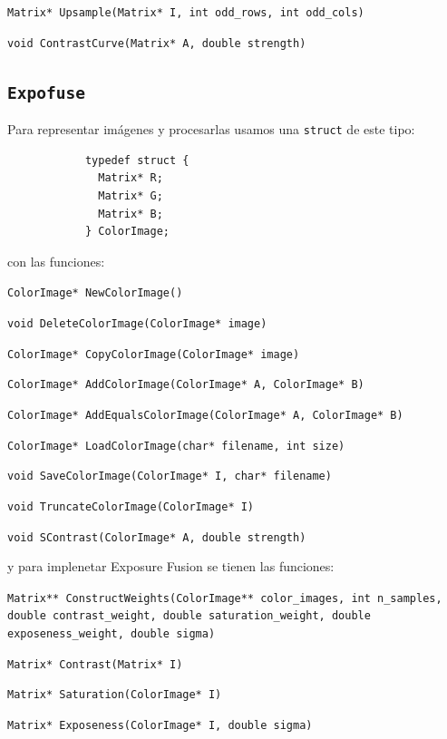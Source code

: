 \documentclass[a4paper,10pt]{article}
\begin{document}
            \texttt{Matrix* Upsample(Matrix* I, int odd\_rows, int odd\_cols)}
            
            \texttt{void ContrastCurve(Matrix* A, double strength)}
        
        \subsection{\texttt{Expofuse}}
            Para representar imágenes y procesarlas usamos una \texttt{struct} de este tipo:
            
            \begin{verbatim}
            typedef struct {
              Matrix* R;
              Matrix* G;
              Matrix* B;
            } ColorImage;\end{verbatim}
            
            con las funciones:
            
            \texttt{ColorImage* NewColorImage()}

            \texttt{void DeleteColorImage(ColorImage* image)}

            \texttt{ColorImage* CopyColorImage(ColorImage* image)}

            \texttt{ColorImage* AddColorImage(ColorImage* A, ColorImage* B)}

            \texttt{ColorImage* AddEqualsColorImage(ColorImage* A, ColorImage* B)}

            \texttt{ColorImage* LoadColorImage(char* filename, int size)}

            \texttt{void SaveColorImage(ColorImage* I, char* filename)}

            \texttt{void TruncateColorImage(ColorImage* I)}

            \texttt{void SContrast(ColorImage* A, double strength)}
            
            \bigskip
            y para implenetar Exposure Fusion se tienen las funciones:
            
            \texttt{Matrix** ConstructWeights(ColorImage** color\_images, int n\_samples, double contrast\_weight, double saturation\_weight, double exposeness\_weight, double sigma)}
            
            \texttt{Matrix* Contrast(Matrix* I)}

            \texttt{Matrix* Saturation(ColorImage* I)}

            \texttt{Matrix* Exposeness(ColorImage* I, double sigma)}
\end{document}
